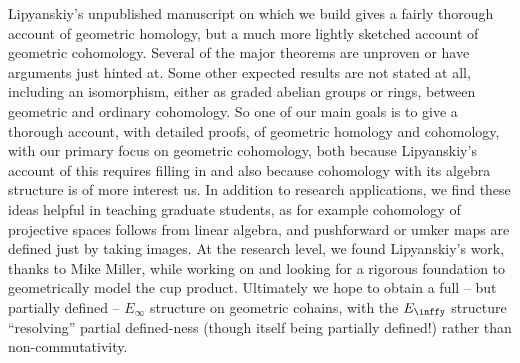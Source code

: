  Lipyanskiy's  unpublished manuscript \cite{Lipy14} on which we build gives a fairly thorough account of geometric homology, 
 but a much more lightly sketched account of geometric cohomology.
Several of the major theorems are unproven or have arguments just hinted at.
Some other expected results are not stated at all, including an isomorphism, either as graded abelian groups or rings, between geometric and ordinary cohomology.
So one of our main goals is to give a thorough account, with detailed proofs, of geometric homology and cohomology, with our primary focus on geometric cohomology, both because Lipyanskiy's account of this requires filling in and also because cohomology with its algebra structure
is of more  interest us.  In addition to research applications, we find these ideas helpful in teaching graduate students, as for example cohomology of projective spaces follows from linear algebra, and pushforward or umker
maps are defined just by taking images.
At the research level, we found Lipyanskiy's work, thanks to Mike Miller, while working on \cite{FMS-flows} and looking for a rigorous foundation to geometrically model the cup product.   Ultimately we hope to obtain a full -- but partially defined --  $E_\infty$ structure on geometric cohains, with the $E_\inffy$ structure ``resolving''
partial defined-ness (though itself being partially defined!) rather than non-commutativity.



